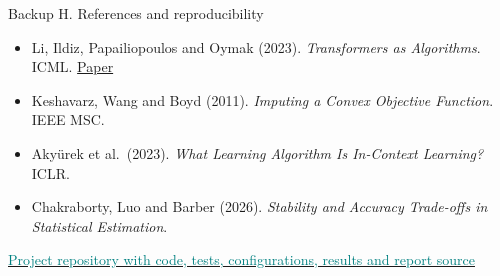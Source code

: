\documentclass[aspectratio=169,11pt]{beamer}
\begin{document}
\begin{frame}[noframenumbering]{Backup H. References and reproducibility}
\footnotesize
\begin{itemize}
\setlength{\itemsep}{3mm}
\item Li, Ildiz, Papailiopoulos and Oymak (2023).
\emph{Transformers as Algorithms}. ICML.
\href{https://proceedings.mlr.press/v202/li23l.html}{Paper}
\item Keshavarz, Wang and Boyd (2011).
\emph{Imputing a Convex Objective Function}. IEEE MSC.
\item Aky\"urek et al.\ (2023).
\emph{What Learning Algorithm Is In-Context Learning?} ICLR.
\item Chakraborty, Luo and Barber (2026).
\emph{Stability and Accuracy Trade-offs in Statistical Estimation}.
\end{itemize}
\vspace{4mm}
\href{https://github.com/feizhanguwaterloo/Stability-and-Information-Sensitivity-in-Transformer-In-Context-Inverse-Learning}
{\textcolor{teal}{Project repository with code, tests, configurations, results and report source}}
\end{frame}
\end{document}
